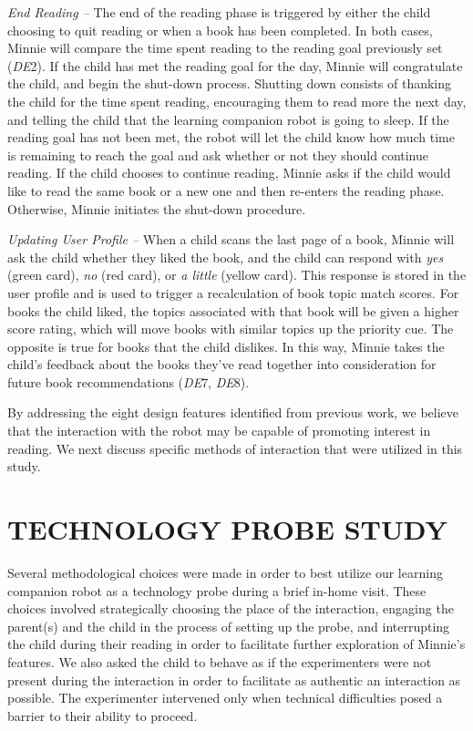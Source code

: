 \documentclass{sigchi}
\begin{document}
\textit{End Reading --} The end of the reading phase is triggered by either the child choosing to quit reading or when a book has been completed. In both cases, Minnie will compare the time spent reading to the reading goal previously set (\textit{DE}2). If the child has met the reading goal for the day, Minnie will congratulate the child, and begin the shut-down process. Shutting down consists of thanking the child for the time spent reading, encouraging them to read more the next day, and telling the child that the learning companion robot is going to sleep. If the reading goal has not been met, the robot will let the child know how much time is remaining to reach the goal and ask whether or not they should continue reading. If the child chooses to continue reading, Minnie asks if the child would like to read the same book or a new one and then re-enters the reading phase. Otherwise, Minnie initiates the shut-down procedure. 

\textit{Updating User Profile --} When a child scans the last page of a book, Minnie will ask the child whether they liked the book, and the child can respond with \textit{yes} (green card), \textit{no} (red card), or \textit{a little} (yellow card). This response is stored in the user profile and is used to trigger a recalculation of book topic match scores. For books the child liked, the topics associated with that book will be given a higher score rating, which will move books with similar topics up the priority cue. The opposite is true for books that the child dislikes. In this way, Minnie takes the child's feedback about the books they've read together into consideration for future book recommendations (\textit{DE}7, \textit{DE}8).

By addressing the eight design features identified from previous work, we believe that the interaction with the robot may be capable of promoting interest in reading. We next discuss specific methods of interaction that were utilized in this study.

\section{TECHNOLOGY PROBE STUDY}
Several methodological choices were made in order to best utilize our learning companion robot as a technology probe during a brief in-home visit. These choices involved strategically choosing the place of the interaction, engaging the parent(s) and the child in the process of setting up the probe, and interrupting the child during their reading in order to facilitate further exploration of Minnie's features. We also asked the child to behave as if the experimenters were not present during the interaction in order to facilitate as authentic an interaction as possible. The experimenter intervened only when technical difficulties posed a barrier to their ability to proceed.
\end{document}

